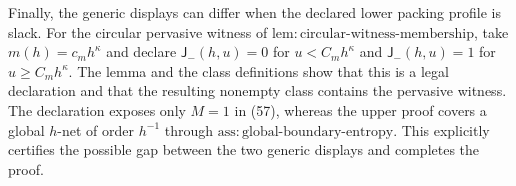 Finally, the generic displays can differ when the declared lower packing profile is slack.  For the circular pervasive witness of \(\mathrm{lem:circular\text{-}witness\text{-}membership}\), take \(m(h)=c_mh^\kappa\) and declare \(\mathsf J_{-}(h,u)=0\) for \(u<C_mh^\kappa\) and \(\mathsf J_{-}(h,u)=1\) for \(u\ge C_mh^\kappa\).  The lemma and the class definitions show that this is a legal declaration and that the resulting nonempty class contains the pervasive witness.  The declaration exposes only \(M=1\) in (57), whereas the upper proof covers a global \(h\)-net of order \(h^{-1}\) through \(\mathrm{ass:global\text{-}boundary\text{-}entropy}\).  This explicitly certifies the possible gap between the two generic displays and completes the proof.